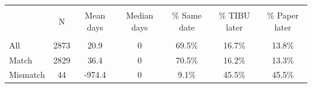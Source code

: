 \scriptsize{
\begin{tabular}{lcccccc}
\hline\hline \\[-8pt]
\rowcolor{yellow!15} & N & Mean days & Median days & \% Same date & \% TIBU later & \% Paper later \\
\hline \\[-8pt]
All & 2873 & 20.9 & 0 & 69.5\% & 16.7\% & 13.8\% \\
Match & 2829 & 36.4 & 0 & 70.5\% & 16.2\% & 13.3\% \\
Mismatch & 44 & -974.4 & 0 & 9.1\% & 45.5\% & 45.5\% \\
\hline\hline
\end{tabular}}
